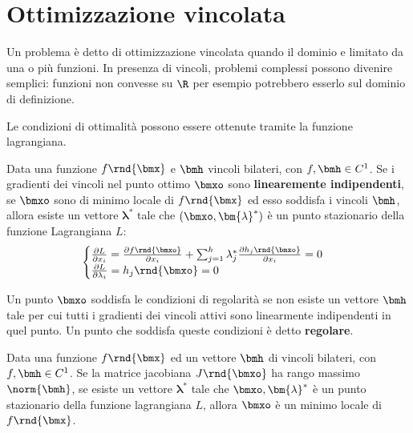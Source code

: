 \documentclass[\main/main.tex]{subfiles}
\begin{document}
\chapter{Ottimizzazione vincolata}
Un problema è detto di ottimizzazione vincolata quando il dominio e limitato da una o più funzioni. In presenza di vincoli, problemi complessi possono divenire semplici: funzioni non convesse su \(\R \) per esempio potrebbero esserlo sul dominio di definizione.

Le condizioni di ottimalità possono essere ottenute tramite la funzione lagrangiana.

\begin{theorem}
    Data una funzione \(f\rnd{\bmx}\) e \(\bmh \) vincoli bilateri, con \(f,\bmh \in C^1\). Se i gradienti dei vincoli nel punto ottimo \(\bmxo \) sono \textbf{linearemente indipendenti}, se \(\bmxo \) sono di minimo locale di \(f\rnd{\bmx}\) ed esso soddisfa i vincoli \(\bmh \), allora esiste un vettore \(\bm{\lambda}^*\) tale che \((\bmxo, \bm{\lambda}^*)\) è un punto stazionario della funzione Lagrangiana \(L\):
    \[
        \begin{cases}
            \frac{\partial L}{\partial x_i} = \frac{\partial f\rnd{\bmxo}}{\partial x_i} + \sum^h_{j=1} \lambda_j^* \frac{\partial h_j\rnd{\bmxo}}{\partial x_i} = 0\\
            \frac{\partial L}{\partial \lambda_i} = h_j\rnd{\bmxo} = 0
        \end{cases}
    \]\end{theorem}

\begin{definition}
    Un punto \(\bmxo \) soddisfa le condizioni di regolarità se non esiste un vettore \(\bmh \) tale per cui tutti i gradienti dei vincoli attivi sono linearmente indipendenti in quel punto. Un punto che soddisfa queste condizioni è detto \textbf{regolare}.
\end{definition}

\begin{theorem}
	Data una funzione \(f\rnd{\bmx}\) ed un vettore \(\bmh \) di vincoli bilateri, con \(f, \bmh \in C^1\). Se la matrice jacobiana \(J\rnd{\bmxo}\) ha rango massimo \(\norm{\bmh}\), se esiste un vettore \(\bm{\lambda}^*\) tale che \(\bmxo, \bm{\lambda}^*\) è un punto stazionario della funzione lagrangiana \(L\), allora \(\bmxo \) è un minimo locale di \(f\rnd{\bmx}\).
\end{theorem}
\end{document}

